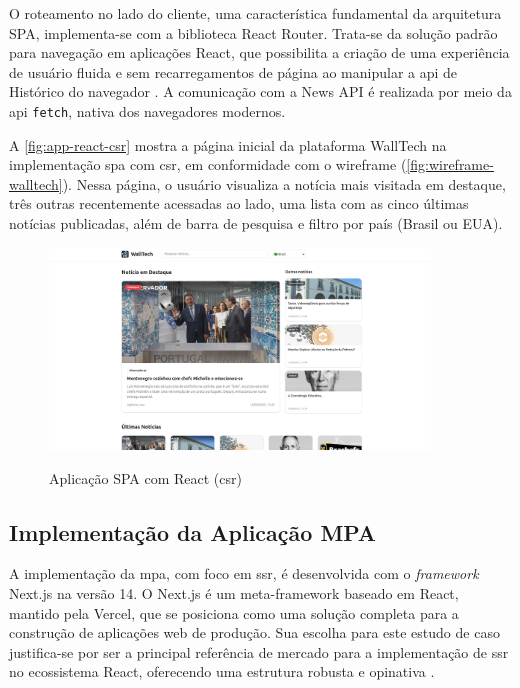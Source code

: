O roteamento no lado do cliente, uma característica fundamental da arquitetura SPA, implementa-se com a biblioteca React Router. Trata-se da solução padrão para navegação em aplicações React, que possibilita a criação de uma experiência de usuário fluida e sem recarregamentos de página ao manipular a \acrshort{api} de Histórico do navegador \cite{react_router_docs}. A comunicação com a News API é realizada por meio da \acrshort{api} \texttt{fetch}, nativa dos navegadores modernos.

A \autoref{fig:app-react-csr} mostra a página inicial da plataforma WallTech na implementação \acrshort{spa} com \acrshort{csr}, em conformidade com o wireframe (\autoref{fig:wireframe-walltech}). Nessa página, o usuário visualiza a notícia mais visitada em destaque, três outras recentemente acessadas ao lado, uma lista com as cinco últimas notícias publicadas, além de barra de pesquisa e filtro por país (Brasil ou EUA).

\begin{figure}[H]
  \centering
  \caption{Aplicação SPA com React (\acrshort{csr})}
  \includegraphics[width=0.9\textwidth]{media/app_react_csr.png}
  \label{fig:app-react-csr}
\end{figure}

\subsection{Implementação da Aplicação MPA}
\label{ssec:implementacao_mpa}

A implementação da \acrfull{mpa}, com foco em \acrfull{ssr}, é desenvolvida com o \emph{framework} Next.js na versão 14. O Next.js é um meta-framework baseado em React, mantido pela Vercel, que se posiciona como uma solução completa para a construção de aplicações web de produção. Sua escolha para este estudo de caso justifica-se por ser a principal referência de mercado para a implementação de \acrshort{ssr} no ecossistema React, oferecendo uma estrutura robusta e opinativa \cite{nextjs2024}.

